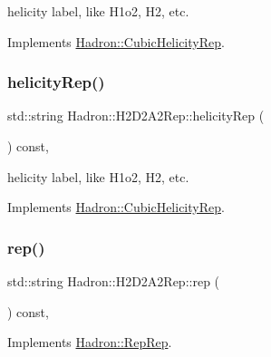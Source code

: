 helicity label, like H1o2, H2, etc. 

Implements \mbox{\hyperlink{structHadron_1_1CubicHelicityRep_af1096946b7470edf0a55451cc662f231}{Hadron\+::\+Cubic\+Helicity\+Rep}}.

\mbox{\label{structHadron_1_1H2D2A2Rep_adfa1f1bca5e0e98eb2eca39372ca7245}} 
\subsubsection{\texorpdfstring{helicityRep()}{helicityRep()}\hspace{0.1cm}{\footnotesize\ttfamily [2/2]}}
{\footnotesize\ttfamily std\+::string Hadron\+::\+H2\+D2\+A2\+Rep\+::helicity\+Rep (\begin{DoxyParamCaption}{ }\end{DoxyParamCaption}) const\hspace{0.3cm}{\ttfamily [inline]}, {\ttfamily [virtual]}}

helicity label, like H1o2, H2, etc. 

Implements \mbox{\hyperlink{structHadron_1_1CubicHelicityRep_af1096946b7470edf0a55451cc662f231}{Hadron\+::\+Cubic\+Helicity\+Rep}}.

\mbox{\label{structHadron_1_1H2D2A2Rep_a41083c39082d6fee296da79892e8b053}} 
\subsubsection{\texorpdfstring{rep()}{rep()}\hspace{0.1cm}{\footnotesize\ttfamily [1/3]}}
{\footnotesize\ttfamily std\+::string Hadron\+::\+H2\+D2\+A2\+Rep\+::rep (\begin{DoxyParamCaption}{ }\end{DoxyParamCaption}) const\hspace{0.3cm}{\ttfamily [inline]}, {\ttfamily [virtual]}}



Implements \mbox{\hyperlink{structHadron_1_1RepRep_ab3213025f6de249f7095892109575fde}{Hadron\+::\+Rep\+Rep}}.

\mbox{\label{structHadron_1_1H2D2A2Rep_a41083c39082d6fee296da79892e8b053}} 
